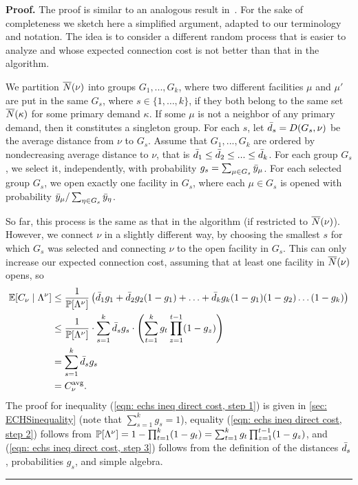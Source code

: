 \documentclass[oneside,final]{ucr}
\newenvironment{proof}[1][Proof]{\textbf{#1.} }{\ \rule{0.5em}{0.5em}}
\begin{document}
\begin{proof}
The proof is similar to an analogous result in~\cite{ChudakS04,ByrkaA10}. 
For the sake of completeness we sketch here a simplified argument, adapted to our
terminology and notation.
The idea is to consider a different random process that is
easier to analyze and whose expected connection cost is not better than that in
the algorithm.

We partition ${\overline{N}}(\nu)$ into groups $G_1,...,G_k$, where two
different facilities $\mu$ and $\mu'$ are put in the same $G_s$, where
$s\in \{1,\ldots,k\}$, if they both belong to the same set
${\overline{N}}(\kappa)$ for some primary demand $\kappa$. If some $\mu$ is
not a neighbor of any primary demand, then it constitutes a singleton
group.  For each $s$, let ${\bar d}_s = D(G_s,\nu)$ be the average
distance from $\nu$ to $G_s$.  Assume that $G_1,...,G_k$ are ordered
by nondecreasing average distance to $\nu$, that is ${\bar d}_1 \le
{\bar d}_2 \le ... \le {\bar d}_k$.  For each group $G_s$, we select it,
independently, with probability $g_s = \sum_{\mu\in G_s}{\bar y}_{\mu}$.
For each selected group $G_s$,  we
open exactly one facility in $G_s$, where each $\mu\in G_s$
is opened with probability ${\bar y}_{\mu}/\sum_{\eta\in G_s}
{\bar y}_{\eta}$.

So far, this process is the same as that in the algorithm (if restricted to ${\overline{N}}(\nu)$).
However, we connect $\nu$ in a slightly different way, by choosing the smallest
$s$ for which $G_s$ was selected and connecting $\nu$ to the open facility in $G_s$.
This can only increase our expected connection cost, assuming that at least one
facility in ${\overline{N}}(\nu)$ opens, so
%
\begin{align}
  \mathbb{E}[C_\nu \mid \Lambda^\nu] &\leq \frac{1}{\mathbb{P}[\Lambda^\nu]}
  \left( {\bar d}_1 g_1 + {\bar d}_2 g_2 (1-g_1) + \ldots + {\bar d}_k g_k
    (1-g_1) (1-g_2) \ldots (1-g_k) \right)
			\notag
  \\
  &\leq \frac{1}{\mathbb{P}[\Lambda^\nu]}
	\cdot \sum_{s=1}^k {\bar d}_s g_s
	\cdot
		\left(\sum_{t=1}^k g_t \prod_{z=1}^{t-1} (1-g_z)\right)
			\label{eqn: echs ineq direct cost, step 1}
  \\
  &= \sum_{s=1}^k {\bar d}_s g_s
			\label{eqn: echs ineq direct cost, step 2}
	\\
			&= C^{{\mbox{\scriptsize\rm avg}}}_{\nu}.
				\label{eqn: echs ineq direct cost, step 3}
\end{align}
%
The proof for inequality (\ref{eqn: echs ineq direct cost, step 1}) 
is given in \ref{sec: ECHSinequality} (note that $\sum_{s=1}^k g_s = 1$),
equality (\ref{eqn: echs ineq direct cost, step 2}) follows from
$\mathbb{P}[\Lambda^\nu] = 1 - \prod_{t=1}^k (1-g_t)
					= \sum_{t=1}^k g_t
                                        \prod_{z=1}^{t-1} (1 - g_z)$,
and (\ref{eqn: echs ineq direct cost, step 3}) follows from the definition
of the distances ${\bar d}_s$, probabilities $g_s$, and simple algebra.
\end{proof}
\end{document}
